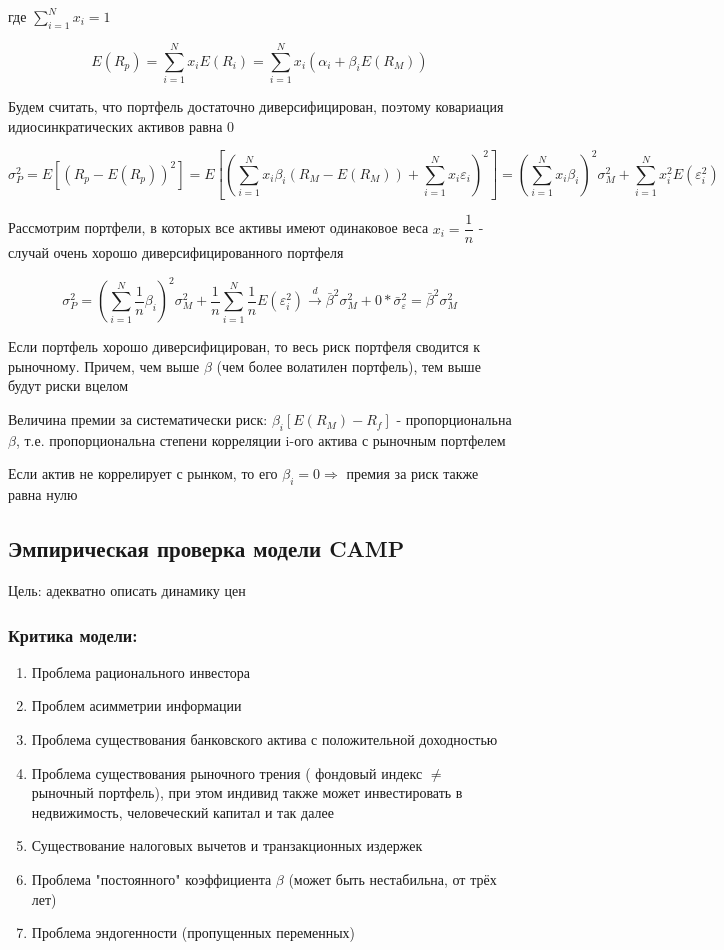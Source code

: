 \documentclass[a4paper,12pt]{article} %
\begin{document}
где $ \sum_{i=1}^{N} x_i = 1 $

\[ E(R_p) =   \sum_{i=1}^{N} x_i E(R_i)  = \sum_{i=1}^{N} x_i (\alpha_i + \beta_i E(R_M) )  \]
 
  Будем считать,  что портфель достаточно диверсифицирован,   поэтому ковариация идиосинкратических активов равна 0
  
   \[ \sigma^2_{P} =  E[(R_p - E(R_p))^2 ] =  E[( \sum_{i=1}^{N} x_i \beta_i(R_M - E(R_M)) +   \sum_{i=1}^{N} x_i \varepsilon_i)^2] =   (\sum_{i=1}^{N} x_i \beta_i)^2  \sigma^2_M  +   \sum_{i=1}^{N} x_i^2 E( \varepsilon_i^2 )    \] 
  
  
  
 Рассмотрим портфели, в которых все активы имеют одинаковое веса $  x_i = \dfrac{1}{n}  $ -  случай очень хорошо диверсифицированного портфеля 
 
 
  \[ \sigma^2_{P} =    (\sum_{i=1}^{N} \dfrac{1}{n}  \beta_i)^2  \sigma^2_M  +  \dfrac{1}{n}  \sum_{i=1}^{N} \dfrac{1}{n}  E( \varepsilon_i^2 ) \xrightarrow{d}  \bar{\beta}^2 \sigma^2_M + 0 * \bar{\sigma}^2_\varepsilon  =   \bar{\beta}^2 \sigma^2_M \] 
 
 
Если портфель хорошо диверсифицирован, то весь  риск портфеля   сводится к рыночному.  
Причем, чем выше $ \beta $ (чем более волатилен портфель),  тем выше будут риски  вцелом

 Величина премии за  систематически риск: $ \beta_i [E(R_M ) - R_f]  $ - пропорциональна $ \beta $, т.е.  пропорциональна степени корреляции i-ого актива с рыночным портфелем 
 
 Если актив не коррелирует с рынком,  то его $ \beta_i = 0 \Rightarrow $ премия за риск также равна нулю 
 
  \subsection{Эмпирическая проверка модели CAMP} 
  
  Цель: адекватно описать динамику цен 
  
 \subsubsection*{  Критика модели: 
   }
   
   \begin{enumerate}
   	\item     Проблема рационального инвестора 
   	\item  Проблем асимметрии информации 
   	\item  Проблема существования банковского актива с положительной доходностью 
   	\item  Проблема существования рыночного трения ( фондовый индекс $ \neq $ рыночный портфель), при этом 
   	индивид также может инвестировать в недвижимость,  человеческий капитал и так далее 
   	\item Существование  налоговых  вычетов и транзакционных  издержек 
   	\item Проблема  "постоянного" коэффициента $ \beta $  (может быть нестабильна, от трёх лет)  
   	\item Проблема эндогенности (пропущенных переменных)


   \end{enumerate}
\end{document}
